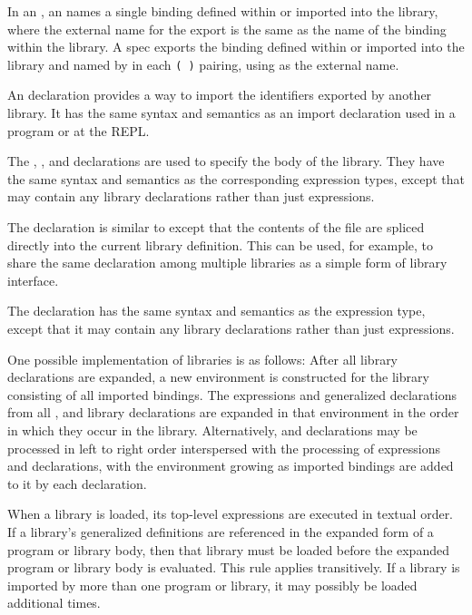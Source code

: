 In an , an  names a single
binding defined within or imported into the library, where the
external name for the export is the same as the name of the binding
within the library. A  spec exports the binding 
defined within or imported into the library and named by
 in each
{\tt( )} pairing,
using  as the external name.

An  declaration provides a way to import the identifiers
exported by another library.  It has the same syntax and semantics
as an import declaration used in a program or at the REPL.

The , , and  declarations are
used to specify the body of
the library.  They have the same syntax and semantics as the corresponding
expression types, except that
 may contain any library declarations rather than
just expressions.

The  declaration is similar to
 except that the contents of the file are spliced directly into the
current library definition.  This can be used, for example, to share the
same  declaration among multiple libraries as a simple
form of library interface.

The  declaration has the same syntax and semantics as
the  expression type, except that it may contain any
library declarations rather than just expressions.


One possible implementation of libraries is as follows:
After all  library declarations are expanded, a new
environment is constructed for the library consisting of all
imported bindings.  The expressions and
generalized declarations from all ,  and 
library declarations are expanded in that environment in the order in which
they occur in the library.
Alternatively,  and  declarations may be processed
in left to right order interspersed with the processing of expressions
and declarations, with the environment growing as imported bindings are
added to it by each  declaration.

When a library is loaded, its top-level expressions are executed
in textual order.
If a library's generalized definitions are referenced in the expanded form of a
program or library body, then that library must be loaded before the
expanded program or library body is evaluated. This rule applies
transitively.  If a library is imported by more than one program or
library, it may possibly be loaded additional times.

